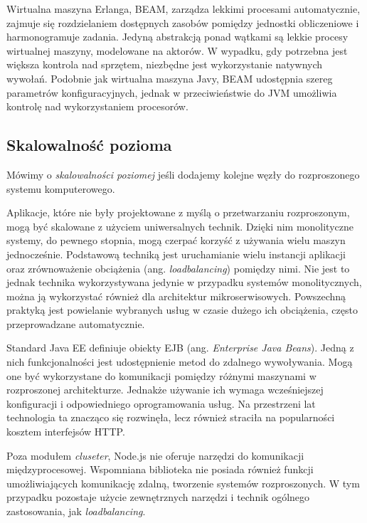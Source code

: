 \documentclass[12pt,twoside]{article}
\begin{document}
Wirtualna maszyna Erlanga, BEAM, zarządza lekkimi procesami
automatycznie, zajmuje się rozdzielaniem dostępnych zasobów pomiędzy
jednostki obliczeniowe i harmonogramuje zadania. Jedyną abstrakcją ponad
wątkami są lekkie procesy wirtualnej maszyny, modelowane na aktorów. W
wypadku, gdy potrzebna jest większa kontrola nad sprzętem, niezbędne
jest wykorzystanie natywnych wywołań. Podobnie jak wirtualna maszyna
Javy, BEAM udostępnia szereg parametrów konfiguracyjnych, jednak w
przeciwieństwie do JVM umożliwia kontrolę nad wykorzystaniem procesorów.

\subsection{Skalowalność pozioma}\label{skalowalnoux15bux107-pozioma}

Mówimy o \emph{skalowalności poziomej} jeśli dodajemy kolejne węzły do
rozproszonego systemu komputerowego.\autocite{elrewini2005advanced}

Aplikacje, które nie były projektowane z myślą o przetwarzaniu
rozproszonym, mogą być skalowane z użyciem uniwersalnych technik. Dzięki
nim monolityczne systemy, do pewnego stopnia, mogą czerpać korzyść z
używania wielu maszyn jednocześnie. Podstawową techniką jest
uruchamianie wielu instancji aplikacji oraz zrównoważenie obciążenia
(ang. \emph{loadbalancing}) pomiędzy nimi. Nie jest to jednak technika
wykorzystywana jedynie w przypadku systemów monolitycznych, można ją
wykorzystać również dla architektur mikroserwisowych. Powszechną
praktyką jest powielanie wybranych usług w czasie dużego ich obciążenia,
często przeprowadzane automatycznie.

Standard Java EE definiuje obiekty EJB (ang. \emph{Enterprise Java
Beans}). Jedną z nich funkcjonalności jest udostępnienie metod do
zdalnego wywoływania. Mogą one być wykorzystane do komunikacji pomiędzy
różnymi maszynami w rozproszonej architekturze. Jednakże używanie ich
wymaga wcześniejszej konfiguracji i odpowiedniego oprogramowania usług.
Na przestrzeni lat technologia ta znacząco się rozwinęła, lecz również
straciła na popularności kosztem interfejsów HTTP.

Poza modułem \emph{cluseter}, Node.js nie oferuje narzędzi do
komunikacji międzyprocesowej. Wspomniana biblioteka nie posiada również
funkcji umożliwiających komunikację zdalną, tworzenie systemów
rozproszonych. W tym przypadku pozostaje użycie zewnętrznych narzędzi i
technik ogólnego zastosowania, jak \emph{loadbalancing}.
\end{document}
